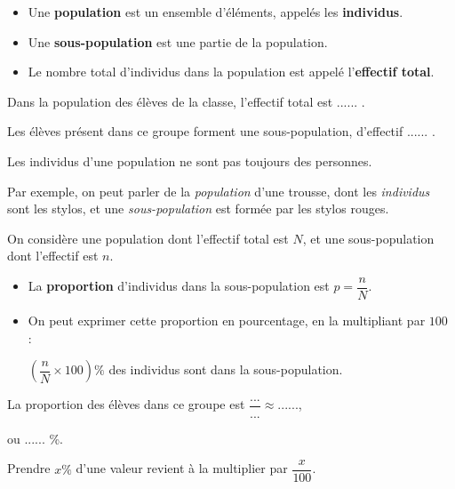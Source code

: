 \documentclass{beamer}
\begin{document}
\begin{frame}
	\begin{definition}[Population]
		\begin{itemize}
			\item Une \textbf{population} est un ensemble d'éléments, appelés les \textbf{individus}.
			\item Une \textbf{sous-population} est une partie de la population.
			\item Le nombre total d'individus dans la population est appelé l'\textbf{effectif total}.
		\end{itemize}
	\end{definition}

	\begin{exemple}
		Dans la population des élèves de la classe, l'effectif total est ...... .

		Les élèves présent dans ce groupe forment une sous-population, d'effectif ...... .
	\end{exemple}
\end{frame}

\begin{frame}
	\begin{remarque}
		Les individus d'une population ne sont pas toujours des personnes.

		Par exemple, on peut parler de la \textit{population} d'une trousse, dont les \textit{individus} sont les stylos, et une \textit{sous-population} est formée par les stylos rouges.
	\end{remarque}
\end{frame}

\begin{frame}
	\begin{definition}[Proportion]
		On considère une population dont l'effectif total est $N$, et une sous-population dont l'effectif est $n$.
		\begin{itemize}
			\item La \textbf{proportion} d'individus dans la sous-population est $p = \dfrac{n}{N}$.
			\item On peut exprimer cette proportion en pourcentage, en la multipliant par $100$ :

			      $\left(\dfrac{n}{N}×100\right) \%$ des individus sont dans la sous-population.
		\end{itemize}
	\end{definition}

	\begin{exemple}
		La proportion des élèves dans ce groupe est $\dfrac{...}{...} ≈ ......$,

		ou ...... \%.
	\end{exemple}
\end{frame}

\begin{frame}
	\begin{remarque}
		Prendre $x\%$ d'une valeur revient à la multiplier par $\dfrac{x}{100}$.
	\end{remarque}
\end{frame}
\end{document}
